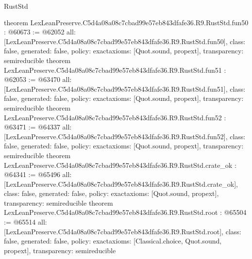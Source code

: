 \begin{lexlean}{RustStd}
\begin{coremodule}
{}
theorem LexLeanPreserve.C5d4a08a08c7cbad99e57eb843dfafe36.R9.RustStd.fun50 : @60673 := @62052 {
  all: [LexLeanPreserve.C5d4a08a08c7cbad99e57eb843dfafe36.R9.RustStd.fun50],
  class: false,
  generated: false,
  policy: exact{axioms: [Quot.sound, propext]},
  transparency: semireducible
}
theorem LexLeanPreserve.C5d4a08a08c7cbad99e57eb843dfafe36.R9.RustStd.fun51 : @62053 := @63470 {
  all: [LexLeanPreserve.C5d4a08a08c7cbad99e57eb843dfafe36.R9.RustStd.fun51],
  class: false,
  generated: false,
  policy: exact{axioms: [Quot.sound, propext]},
  transparency: semireducible
}
theorem LexLeanPreserve.C5d4a08a08c7cbad99e57eb843dfafe36.R9.RustStd.fun52 : @63471 := @64337 {
  all: [LexLeanPreserve.C5d4a08a08c7cbad99e57eb843dfafe36.R9.RustStd.fun52],
  class: false,
  generated: false,
  policy: exact{axioms: [Quot.sound, propext]},
  transparency: semireducible
}
theorem LexLeanPreserve.C5d4a08a08c7cbad99e57eb843dfafe36.R9.RustStd.crate_ok : @64341 := @65496 {
  all: [LexLeanPreserve.C5d4a08a08c7cbad99e57eb843dfafe36.R9.RustStd.crate_ok],
  class: false,
  generated: false,
  policy: exact{axioms: [Quot.sound, propext]},
  transparency: semireducible
}
theorem LexLeanPreserve.C5d4a08a08c7cbad99e57eb843dfafe36.R9.RustStd.root : @65504 := @65514 {
  all: [LexLeanPreserve.C5d4a08a08c7cbad99e57eb843dfafe36.R9.RustStd.root],
  class: false,
  generated: false,
  policy: exact{axioms: [Classical.choice, Quot.sound, propext]},
  transparency: semireducible
}


\end{coremodule}
\end{lexlean}
